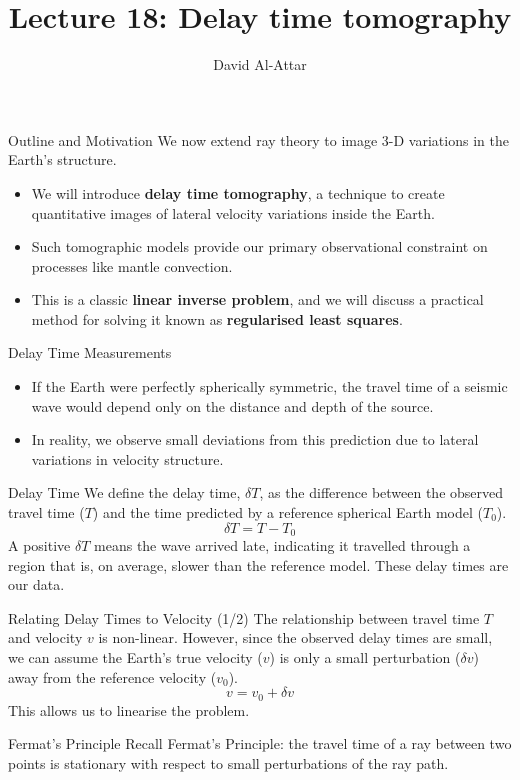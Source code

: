 \documentclass{beamer}
\title[Lecture 18: Delay time tomography]{Lecture 18: Delay time tomography}
\author{David Al-Attar}
\institute{Michaelmas term 2024}
\date{}
\begin{document}

\begin{frame}
    \titlepage
\end{frame}

\begin{frame}{Outline and Motivation}
    We now extend ray theory to image 3-D variations in the Earth's structure.
    \begin{itemize}
        \item We will introduce \textbf{delay time tomography}, a technique to create quantitative images of lateral velocity variations inside the Earth.
        \pause
        \item Such tomographic models provide our primary observational constraint on processes like mantle convection.
        \pause
        \item This is a classic \textbf{linear inverse problem}, and we will discuss a practical method for solving it known as \textbf{regularised least squares}.
    \end{itemize}
\end{frame}


\begin{frame}{Delay Time Measurements}
    \begin{itemize}
        \item If the Earth were perfectly spherically symmetric, the travel time of a seismic wave would depend only on the distance and depth of the source.
        \pause
        \item In reality, we observe small deviations from this prediction due to lateral variations in velocity structure.
    \end{itemize}
    \pause
    \begin{alertblock}{Delay Time}
        We define the delay time, $ \delta T $, as the difference between the observed travel time ($T$) and the time predicted by a reference spherical Earth model ($T_0$).
        $$ \delta T = T - T_0 $$
        A positive $ \delta T $ means the wave arrived late, indicating it travelled through a region that is, on average, slower than the reference model. These delay times are our data.
    \end{alertblock}
\end{frame}


\begin{frame}{Relating Delay Times to Velocity (1/2)}
    The relationship between travel time $T$ and velocity $v$ is non-linear. However, since the observed delay times are small, we can assume the Earth's true velocity ($v$) is only a small perturbation ($\delta v$) away from the reference velocity ($v_0$).
    $$ v = v_0 + \delta v $$
    \pause
    This allows us to linearise the problem.
    \pause
    \begin{block}{Fermat's Principle}
        Recall Fermat's Principle: the travel time of a ray between two points is stationary with respect to small perturbations of the ray path.
    \end{block}
\end{frame}
\end{document}
